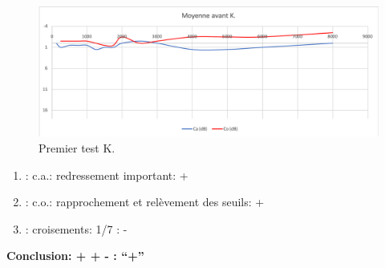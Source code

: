         \begin{figure}
\centering
\includegraphics[width=0.7\linewidth]{images/graphiques/kad_pre.png}
\caption[Moyenne OG+OD]{Premier test K.}
       
\label{groupecontroleimage1}
\end{figure}
	\begin{enumerate}
 		
 		\item : c.a.: redressement important: +
                
 		\item : c.o.: rapprochement et relèvement des seuils: +
 		\item : croisements: 1/7 :  -
                  
                \end{enumerate}

                \textbf{  Conclusion:  + + -       : ``+''}

